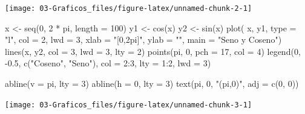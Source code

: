 \documentclass[
]{book}
\newenvironment{Shaded}{\begin{snugshade}}{\end{snugshade}}
\newcommand{\AttributeTok}[1]{\textcolor[rgb]{0.77,0.63,0.00}{#1}}
\newcommand{\DecValTok}[1]{\textcolor[rgb]{0.00,0.00,0.81}{#1}}
\newcommand{\FloatTok}[1]{\textcolor[rgb]{0.00,0.00,0.81}{#1}}
\newcommand{\FunctionTok}[1]{\textcolor[rgb]{0.00,0.00,0.00}{#1}}
\newcommand{\NormalTok}[1]{#1}
\newcommand{\OtherTok}[1]{\textcolor[rgb]{0.56,0.35,0.01}{#1}}
\newcommand{\SpecialCharTok}[1]{\textcolor[rgb]{0.00,0.00,0.00}{#1}}
\newcommand{\StringTok}[1]{\textcolor[rgb]{0.31,0.60,0.02}{#1}}
\theoremstyle{break}
\theoremstyle{nonumberplain}
\begin{document}
\begin{center}\texttt{[image: 03-Graficos\_files/figure-latex/unnamed-chunk-2-1]} \end{center}

\begin{Shaded}
\begin{Highlighting}[]
\NormalTok{x }\OtherTok{\textless{}{-}} \FunctionTok{seq}\NormalTok{(}\DecValTok{0}\NormalTok{, }\DecValTok{2} \SpecialCharTok{*}\NormalTok{ pi, }\AttributeTok{length =} \DecValTok{100}\NormalTok{)}
\NormalTok{y1 }\OtherTok{\textless{}{-}} \FunctionTok{cos}\NormalTok{(x)}
\NormalTok{y2 }\OtherTok{\textless{}{-}} \FunctionTok{sin}\NormalTok{(x)}
\FunctionTok{plot}\NormalTok{( x, y1, }\AttributeTok{type =} \StringTok{"l"}\NormalTok{, }\AttributeTok{col =} \DecValTok{2}\NormalTok{, }\AttributeTok{lwd =} \DecValTok{3}\NormalTok{, }\AttributeTok{xlab =} \StringTok{"[0,2pi]"}\NormalTok{, }\AttributeTok{ylab =} \StringTok{""}\NormalTok{, }\AttributeTok{main =} \StringTok{"Seno y Coseno"}\NormalTok{)}
\FunctionTok{lines}\NormalTok{(x, y2, }\AttributeTok{col =} \DecValTok{3}\NormalTok{, }\AttributeTok{lwd =} \DecValTok{3}\NormalTok{, }\AttributeTok{lty =} \DecValTok{2}\NormalTok{)}
\FunctionTok{points}\NormalTok{(pi, }\DecValTok{0}\NormalTok{, }\AttributeTok{pch =} \DecValTok{17}\NormalTok{, }\AttributeTok{col =} \DecValTok{4}\NormalTok{)}
\FunctionTok{legend}\NormalTok{(}\DecValTok{0}\NormalTok{, }\SpecialCharTok{{-}}\FloatTok{0.5}\NormalTok{, }\FunctionTok{c}\NormalTok{(}\StringTok{"Coseno"}\NormalTok{, }\StringTok{"Seno"}\NormalTok{), }\AttributeTok{col =} \DecValTok{2}\SpecialCharTok{:}\DecValTok{3}\NormalTok{, }\AttributeTok{lty =} \DecValTok{1}\SpecialCharTok{:}\DecValTok{2}\NormalTok{, }\AttributeTok{lwd =} \DecValTok{3}\NormalTok{)}

\FunctionTok{abline}\NormalTok{(}\AttributeTok{v =}\NormalTok{ pi, }\AttributeTok{lty =} \DecValTok{3}\NormalTok{)}
\FunctionTok{abline}\NormalTok{(}\AttributeTok{h =} \DecValTok{0}\NormalTok{, }\AttributeTok{lty =} \DecValTok{3}\NormalTok{)}
\FunctionTok{text}\NormalTok{(pi, }\DecValTok{0}\NormalTok{, }\StringTok{"(pi,0)"}\NormalTok{, }\AttributeTok{adj =} \FunctionTok{c}\NormalTok{(}\DecValTok{0}\NormalTok{, }\DecValTok{0}\NormalTok{))}
\end{Highlighting}
\end{Shaded}

\begin{center}\texttt{[image: 03-Graficos\_files/figure-latex/unnamed-chunk-3-1]} \end{center}
\end{document}
